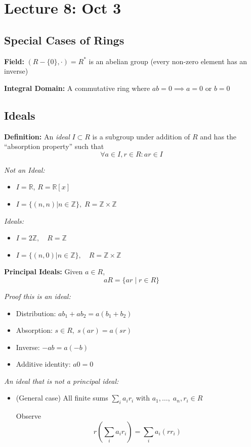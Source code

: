 \documentclass[12pt]{report}
\newcommand{\R}{\mathbb{R}}
\newcommand{\Z}{\mathbb{Z}}
\begin{document}
\section*{Lecture 8: Oct 3}
\subsection*{Special Cases of Rings}
\textbf{Field:} $(R - \{0\}, \cdot) = R^*$ is an abelian group (every non-zero element has an inverse)

\textbf{Integral Domain:} A commutative ring where $ab = 0 \implies a = 0 \text{ or } b = 0$

\subsection*{Ideals}
\textbf{Definition:} An \emph{ideal} $I \subset R$ is a subgroup under addition of $R$ and has the ``absorption property'' such that 
\[\forall a \in I, r \in R: ar \in I \]

\emph{Not an Ideal:} 
\begin{itemize}
    \item $I = \R$, $R = \R[x]$
    \item $I = \{(n, n) \big\vert n\in \Z\}, \; R = \Z \times \Z$
\end{itemize}

\emph{Ideals:}
\begin{itemize}
    \item $I = 2\Z, \quad R = \Z$
    \item $I = \{(n, 0) \big\vert n \in \Z\}, \quad R = \Z \times \Z$
\end{itemize}
\vspace{0.25in}

\textbf{Principal Ideals:} Given $a \in R$, 
\[aR = \{ar \; | \; r \in R\}\]

\emph{Proof this is an ideal:}
\begin{itemize}
    \item Distribution: $ab_1 + ab_2 = a(b_1 + b_2)$
    \item Absorption: $s \in R, \; s(ar) = a(sr)$
    \item Inverse: $-ab = a(-b)$
    \item Additive identity: $a0 = 0$
\end{itemize}

\emph{An ideal that is not a principal ideal:}
\begin{itemize}
    \item (General case) All finite sums $\sum_i a_i r_i$ with $a_1, \dots, \; a_n, r_i \in R$ 
    
    Observe 
    \[r\left(\sum_i a_i r_i\right) = \sum_i a_i (rr_i)\]

\end{itemize}
\end{document}
